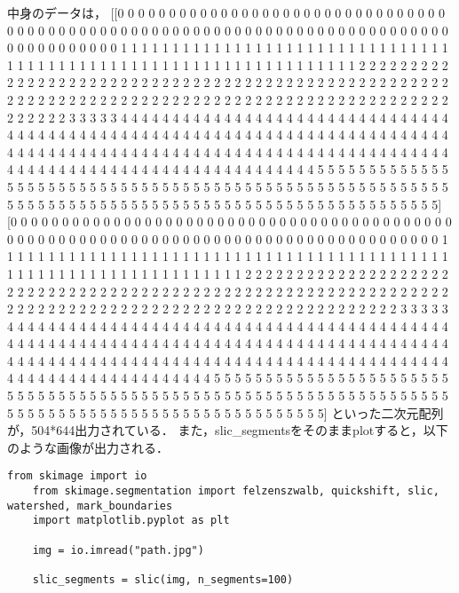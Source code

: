 \documentclass[11pt,a4j]{jarticle} 			%
\begin{document}
	中身のデータは，
	[[0 0 0 0 0 0 0 0 0 0 0 0 0 0 0 0 0 0 0 0 0 0 0 0 0 0 0 0 0 0 0 0 0 0 0 0 0
	0 0 0 0 0 0 0 0 0 0 0 0 0 0 0 0 0 0 0 0 0 0 0 0 0 0 0 0 0 0 0 0 0 0 0 0 0
	0 0 0 0 0 0 0 0 0 0 0 0 1 1 1 1 1 1 1 1 1 1 1 1 1 1 1 1 1 1 1 1 1 1 1 1 1
	1 1 1 1 1 1 1 1 1 1 1 1 1 1 1 1 1 1 1 1 1 1 1 1 1 1 1 1 1 1 1 1 1 1 1 1 1
	1 1 1 1 2 2 2 2 2 2 2 2 2 2 2 2 2 2 2 2 2 2 2 2 2 2 2 2 2 2 2 2 2 2 2 2 2
	2 2 2 2 2 2 2 2 2 2 2 2 2 2 2 2 2 2 2 2 2 2 2 2 2 2 2 2 2 2 2 2 2 2 2 2 2
	2 2 2 2 2 2 2 2 2 2 2 2 2 2 2 2 2 2 2 2 2 2 2 2 2 2 2 2 2 2 2 3 3 3 3 3 4
	4 4 4 4 4 4 4 4 4 4 4 4 4 4 4 4 4 4 4 4 4 4 4 4 4 4 4 4 4 4 4 4 4 4 4 4 4
	4 4 4 4 4 4 4 4 4 4 4 4 4 4 4 4 4 4 4 4 4 4 4 4 4 4 4 4 4 4 4 4 4 4 4 4 4
	4 4 4 4 4 4 4 4 4 4 4 4 4 4 4 4 4 4 4 4 4 4 4 4 4 4 4 4 4 4 4 4 4 4 4 4 4
	4 4 4 4 4 4 4 4 4 4 4 4 4 4 4 4 4 4 4 4 4 4 4 4 4 4 4 4 4 4 4 4 4 4 4 4 5
	5 5 5 5 5 5 5 5 5 5 5 5 5 5 5 5 5 5 5 5 5 5 5 5 5 5 5 5 5 5 5 5 5 5 5 5 5
	5 5 5 5 5 5 5 5 5 5 5 5 5 5 5 5 5 5 5 5 5 5 5 5 5 5 5 5 5 5 5 5 5 5 5 5 5
	5 5 5 5 5 5 5 5 5 5 5 5 5 5 5 5 5 5 5 5 5 5 5]
	[0 0 0 0 0 0 0 0 0 0 0 0 0 0 0 0 0 0 0 0 0 0 0 0 0 0 0 0 0 0 0 0 0 0 0 0 0
	0 0 0 0 0 0 0 0 0 0 0 0 0 0 0 0 0 0 0 0 0 0 0 0 0 0 0 0 0 0 0 0 0 0 0 0 0
	0 0 0 0 0 0 0 0 0 0 0 1 1 1 1 1 1 1 1 1 1 1 1 1 1 1 1 1 1 1 1 1 1 1 1 1 1
	1 1 1 1 1 1 1 1 1 1 1 1 1 1 1 1 1 1 1 1 1 1 1 1 1 1 1 1 1 1 1 1 1 1 1 1 1
	1 1 1 1 2 2 2 2 2 2 2 2 2 2 2 2 2 2 2 2 2 2 2 2 2 2 2 2 2 2 2 2 2 2 2 2 2
	2 2 2 2 2 2 2 2 2 2 2 2 2 2 2 2 2 2 2 2 2 2 2 2 2 2 2 2 2 2 2 2 2 2 2 2 2
	2 2 2 2 2 2 2 2 2 2 2 2 2 2 2 2 2 2 2 2 2 2 2 2 2 2 2 2 2 2 2 3 3 3 3 3 4
	4 4 4 4 4 4 4 4 4 4 4 4 4 4 4 4 4 4 4 4 4 4 4 4 4 4 4 4 4 4 4 4 4 4 4 4 4
	4 4 4 4 4 4 4 4 4 4 4 4 4 4 4 4 4 4 4 4 4 4 4 4 4 4 4 4 4 4 4 4 4 4 4 4 4
	4 4 4 4 4 4 4 4 4 4 4 4 4 4 4 4 4 4 4 4 4 4 4 4 4 4 4 4 4 4 4 4 4 4 4 4 4
	4 4 4 4 4 4 4 4 4 4 4 4 4 4 4 4 4 4 4 4 4 4 4 4 4 4 4 4 4 4 4 4 4 4 4 4 4
	5 5 5 5 5 5 5 5 5 5 5 5 5 5 5 5 5 5 5 5 5 5 5 5 5 5 5 5 5 5 5 5 5 5 5 5 5
	5 5 5 5 5 5 5 5 5 5 5 5 5 5 5 5 5 5 5 5 5 5 5 5 5 5 5 5 5 5 5 5 5 5 5 5 5
	5 5 5 5 5 5 5 5 5 5 5 5 5 5 5 5 5 5 5 5 5 5 5]
	といった二次元配列が，504*644出力されている．
	また，slic\_segmentsをそのままplotすると，以下のような画像が出力される．
	
	\begin{lstlisting}[caption=slicアルゴリズムのコード例,label=fuga]
	from skimage import io
	from skimage.segmentation import felzenszwalb, quickshift, slic, watershed, mark_boundaries
	import matplotlib.pyplot as plt
	
	img = io.imread("path.jpg")
	
	slic_segments = slic(img, n_segments=100)
	\end{lstlisting}
	
\end{document}
